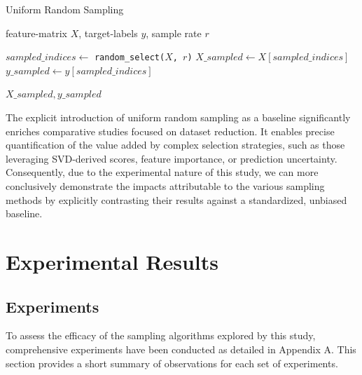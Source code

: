 \documentclass{article}
\theoremstyle{plain}
\theoremstyle{definition}
\theoremstyle{remark}
\begin{document}
\begin{algorithm}[tb]
	\caption{Uniform Random Sampling}
	\label{alg:random_alg}
	\begin{algorithmic}
		 feature-matrix $X$, target-labels $y$, sample rate $r$
		
		\vspace{0.25cm}
		
		\STATE $sampled\_indices \leftarrow$ \texttt{random\_select($X$, $r$)}
		\STATE $X\_sampled \leftarrow X[sampled\_indices]$
		\STATE $y\_sampled \leftarrow y[sampled\_indices]$
		
		\vspace{0.25cm}
		
		 \texttt{$X\_sampled, y\_sampled$}
	\end{algorithmic}
\end{algorithm}


The explicit introduction of uniform random sampling as a baseline significantly enriches comparative studies focused on dataset reduction. It enables precise quantification of the value added by complex selection strategies, such as those leveraging SVD-derived scores, feature importance, or prediction uncertainty. Consequently, due to the experimental nature of this study, we can more conclusively demonstrate the impacts attributable to the various sampling methods by explicitly contrasting their results against a standardized, unbiased baseline.


\section{Experimental Results}

\subsection{Experiments}

To assess the efficacy of the sampling algorithms explored by this study, comprehensive experiments have been conducted as detailed in Appendix A. This section provides a short summary of observations for each set of experiments.
\end{document}
